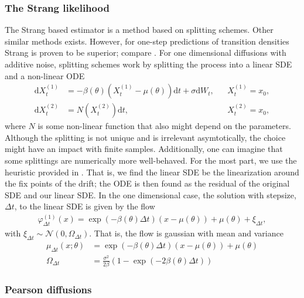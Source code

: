 \subsubsection{The Strang likelihood}
The Strang based estimator is a method based on splitting schemes. Other similar methods exists. However, for one-step predictions of transition densities Strang is proven to be superior; compare \cite[Proposition 3.4 and 3.6]{SplittingSchemes}. For one dimensional diffusions with additive noise, splitting schemes work by splitting the process into a linear SDE and a non-linear ODE
\begin{align}
    \mathrm{d}X_t^{(1)} &= -\beta(\theta)\left(X_t^{(1)} - \mu(\theta)\right)\mathrm{d}t + \sigma \mathrm{d}W_t, &&X_t^{(1)} = x_0, \\
    \mathrm{d}X_t^{(2)} &= N\left(X_t^{(2)}\right)\mathrm{d}t, &&X_t^{(2)} = x_0,
\end{align}
where $N$ is some non-linear function that also might depend on the parameters. Although the splitting is not unique and is irrelevant asymtotically, the choice might have an impact with finite samples. Additionally, one can imagine that some splittings are numerically more well-behaved. For the most part, we use the heuristic provided in \cite[section 2.3 and 2.5]{SplittingSchemes}. That is, we find the linear SDE be the linearization around the fix points of the drift; the ODE is then found as the residual of the original SDE and our linear SDE. In the one dimensional case, the solution with stepsize, $\Delta t$, to the linear SDE is given by the flow
\begin{align}
    \varphi_{\Delta t}^{(1)}(x) = \exp\left(-\beta\left(\theta\right) \Delta t\right)\left(x - \mu\left(\theta\right)\right) + \mu\left(\theta\right) + \xi_{\Delta t},
\end{align}
with $\xi_{\Delta t}\sim\mathcal{N}\left(0, \Omega_{\Delta t}\right)$. That is, the flow is gaussian with mean and variance
\begin{align}
    \mu_{\Delta t}(x; \theta) &= \exp\left(-\beta\left(\theta\right) \Delta t\right)\left(x - \mu\left(\theta\right)\right) + \mu\left(\theta\right)\\
    \Omega_{\Delta t} &= \frac{\sigma^2}{2\beta}\left(1 - \exp\left(-2\beta\left(\theta\right)\Delta t\right)\right)
\end{align}
\subsubsection{Pearson diffusions}

